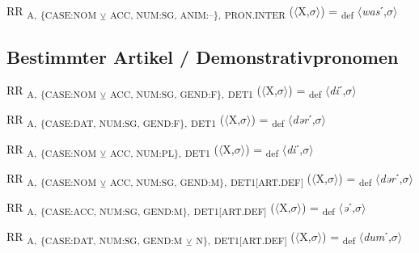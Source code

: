 {\begin{exe}
 RR \textsubscript{A,} \textsubscript{\{CASE:NOM} \textsubscript{${\veebar}$}\textsubscript{ ACC, NUM:SG, ANIM:–\},} \textsubscript{PRON.INTER} ($\langle$X,$\sigma $$\rangle$) = \textsubscript{def} $\langle$\textit{was}ˊ,$\sigma $$\rangle$
\end{exe}

\subsection{Bestimmter Artikel / Demonstrativpronomen}

\begin{exe}
 RR \textsubscript{A,} \textsubscript{\{CASE:NOM} \textsubscript{${\veebar}$}\textsubscript{ ACC, NUM:SG, GEND:F\},} \textsubscript{DET1} ($\langle$X,$\sigma $$\rangle$) = \textsubscript{def} $\langle$\textit{di}ˊ,$\sigma $$\rangle$
\end{exe}

\begin{exe}
 RR \textsubscript{A,} \textsubscript{\{CASE:DAT, NUM:SG, GEND:F\},} \textsubscript{DET1} ($\langle$X,$\sigma $$\rangle$) = \textsubscript{def} $\langle$\textit{dər}ˊ,$\sigma $$\rangle$
\end{exe}

\begin{exe}
 RR \textsubscript{A,} \textsubscript{\{CASE:NOM} \textsubscript{${\veebar}$}\textsubscript{ ACC, NUM:PL\},} \textsubscript{DET1} ($\langle$X,$\sigma $$\rangle$) = \textsubscript{def} $\langle$\textit{di}ˊ,$\sigma $$\rangle$
\end{exe}

\begin{exe}
 RR \textsubscript{A,} \textsubscript{\{CASE:NOM} \textsubscript{${\veebar}$}\textsubscript{ ACC, NUM:SG, GEND:M\},} \textsubscript{DET1[ART.DEF]} ($\langle$X,$\sigma $$\rangle$) = \textsubscript{def} $\langle$\textit{dər}ˊ,$\sigma $$\rangle$
\end{exe}

\begin{exe}
 RR \textsubscript{A,} \textsubscript{\{CASE:ACC, NUM:SG, GEND:M\},} \textsubscript{DET1[ART.DEF]} ($\langle$X,$\sigma $$\rangle$) = \textsubscript{def} $\langle$\textit{ə}ˊ,$\sigma $$\rangle$
\end{exe}

\begin{exe}
 RR \textsubscript{A,} \textsubscript{\{CASE:DAT, NUM:SG, GEND:M} \textsubscript{${\veebar}$}\textsubscript{ N\},} \textsubscript{DET1[ART.DEF]} ($\langle$X,$\sigma $$\rangle$) = \textsubscript{def} $\langle$\textit{dum}ˊ,$\sigma $$\rangle$
\end{exe}

}
